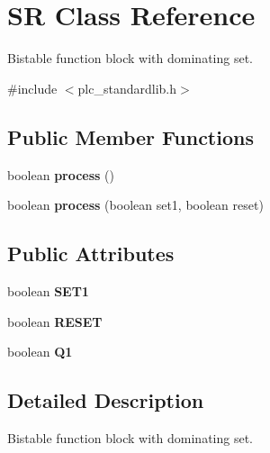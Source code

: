 \hypertarget{class_s_r}{\section{S\+R Class Reference}
\label{class_s_r}
}


Bistable function block with dominating set.  




{\ttfamily \#include $<$plc\+\_\+standardlib.\+h$>$}

\subsection*{Public Member Functions}
\begin{DoxyCompactItemize}
\item 
\hypertarget{class_s_r_a3a988692176046e51fc54aa0243a6eb9}{boolean {\bfseries process} ()}\label{class_s_r_a3a988692176046e51fc54aa0243a6eb9}

\item 
\hypertarget{class_s_r_aecb6980c0312475f2c3bc5cd4fc8e06e}{boolean {\bfseries process} (boolean set1, boolean reset)}\label{class_s_r_aecb6980c0312475f2c3bc5cd4fc8e06e}

\end{DoxyCompactItemize}
\subsection*{Public Attributes}
\begin{DoxyCompactItemize}
\item 
\hypertarget{class_s_r_a44196f4c72fa152aaa9d40e991d59d61}{boolean {\bfseries S\+E\+T1}}\label{class_s_r_a44196f4c72fa152aaa9d40e991d59d61}

\item 
\hypertarget{class_s_r_ace1d5c006cb30bf1fc4bc1e953b6836f}{boolean {\bfseries R\+E\+S\+E\+T}}\label{class_s_r_ace1d5c006cb30bf1fc4bc1e953b6836f}

\item 
\hypertarget{class_s_r_a50514e0974cd7d30c270a46dccadae24}{boolean {\bfseries Q1}}\label{class_s_r_a50514e0974cd7d30c270a46dccadae24}

\end{DoxyCompactItemize}


\subsection{Detailed Description}
Bistable function block with dominating set. 

